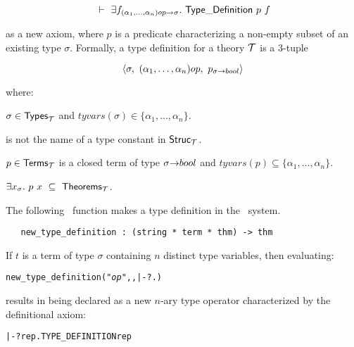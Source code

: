 \[\turn \equant{f_{(\alpha_1,\ldots,\alpha_n)\ty{op}\fun\sigma}}\TyDef\ p\ f\]

\noindent as a new axiom, where $p$ is a predicate
characterizing a
non-empty subset of an existing type $\sigma$.  Formally, a type definition
for a theory ${\cal T}$ is a $3$-tuple

\[ \langle \sigma,\ (\alpha_1,\ldots,\alpha_n)\ty{op},
    \ p_{\sigma\fun\ty{bool}}\rangle \]

\noindent where:

\begin{myenumerate}
\item $\sigma\in{\sf Types}_{\cal T}$  and
$tyvars(\sigma)\in\{\alpha_1, \ldots , \alpha_n\}$.
\item {} is not the name of a type constant in ${\sf Struc}_{\cal T}$.
\item $p\in{\sf Terms}_{\cal T}$ is a closed term of
type $\sigma{\to}{\sl bool}$  and
$tyvars(p)\subseteq\{\alpha_1, \ldots , \alpha_n\}$.
\item $\exists x_{\sigma}.\ p\ x \ \subseteq\ {\sf Theorems}_{\cal T}$.
\end{myenumerate}

The following \ML\ function makes a type definition in the \HOL\ system.

\begin{boxed}
\begin{verbatim}
   new_type_definition : (string * term * thm) -> thm
\end{verbatim}\end{boxed}

\noindent If $t$ is a term of type
$\sigma$ containing $n$ distinct type variables, then
evaluating:

{\def\op{{\normalsize\sl op}}
\begin{hol}\begin{alltt}
   new_type_definition("{\op}", , |- ?.)
\end{alltt}\end{hol}}

\noindent results in  being declared as a new $n$-ary type operator
characterized by the definitional axiom:

\begin{hol}\begin{alltt}
   |- ?rep. TYPE\_DEFINITION  rep
\end{alltt}\end{hol}

